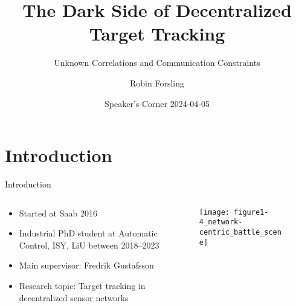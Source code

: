 \documentclass[aspectratio=1610]{beamer}
\title[Decentralized Target Tracking]{\Large The Dark Side of Decentralized Target Tracking}
\subtitle{\normalsize Unknown Correlations and Communication Constraints} %
\author{Robin Forsling}
\institute[]{%
}
\date[]{Speaker's Corner 2024-04-05 %
}
\begin{document}
\thispagestyle{empty}
\begin{frame}
    \titlepage
\end{frame}



\addtocounter{framenumber}{-1}





\section{Introduction}



\begin{frame}{Introduction}

\begin{columns}

\begin{column}{.5\textwidth}
    \begin{itemize}
        \item Started at Saab 2016
        \item Industrial PhD student at Automatic Control, ISY, LiU between 2018--2023
        \item Main supervisor: Fredrik Gustafsson
        \item Research topic: Target tracking in decentralized sensor networks
    \end{itemize}
\end{column}

\begin{column}{.5\textwidth}

    \begin{figure}
        \centering
        \texttt{[image: figure1-4\_network-centric\_battle\_scene]}
    \end{figure}

\end{column}

\end{columns}

\end{frame}
\end{document}
